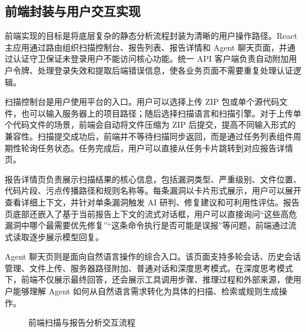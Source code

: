 \documentclass[a4paper,12pt,UTF8]{ctexart}
\numberwithin{figure}{section}
\numberwithin{table}{section}
\numberwithin{equation}{section}
\begin{document}
\subsection{前端封装与用户交互实现}

{\songti
前端实现的目标是将底层复杂的静态分析流程封装为清晰的用户操作路径。React 主应用通过路由组织扫描控制台、报告列表、报告详情和 Agent 聊天页面，并通过认证守卫保证未登录用户不能访问核心功能。统一 API 客户端负责自动附加用户令牌、处理登录失效和提取后端错误信息，使各业务页面不需要重复处理认证逻辑。

扫描控制台是用户使用平台的入口。用户可以选择上传 ZIP 包或单个源代码文件，也可以输入服务器上的项目路径；随后选择扫描语言和扫描引擎。对于上传单个代码文件的场景，前端会自动将文件压缩为 ZIP 后提交，提高不同输入形式的兼容性。扫描提交成功后，前端并不等待扫描同步返回，而是通过任务列表组件周期性轮询任务状态。任务完成后，用户可以直接从任务卡片跳转到对应报告详情页。

报告详情页负责展示扫描结果的核心信息，包括漏洞类型、严重级别、文件位置、代码片段、污点传播路径和规则名称等。每条漏洞以卡片形式展示，用户可以展开查看详细上下文，并针对单条漏洞触发 AI 研判、修复建议和可利用性评估。报告页底部还嵌入了基于当前报告上下文的流式对话框，用户可以直接询问“这些高危漏洞中哪个最需要优先修复”“这条命令执行是否可能是误报”等问题，前端通过流式读取逐步展示模型回复。

Agent 聊天页则是面向自然语言操作的综合入口。该页面支持多轮会话、历史会话管理、文件上传、服务器路径附加、普通对话和深度思考模式。在深度思考模式下，前端不仅展示最终回答，还会展示工具调用步骤、推理过程和外部来源，使用户能够理解 Agent 如何从自然语言需求转化为具体的扫描、检索或规则生成操作。
\par}

\begin{figure}[htbp]
\centering
{}
\caption{前端扫描与报告分析交互流程}
\label{fig:frontend-scan-flow}
\end{figure}
\end{document}
